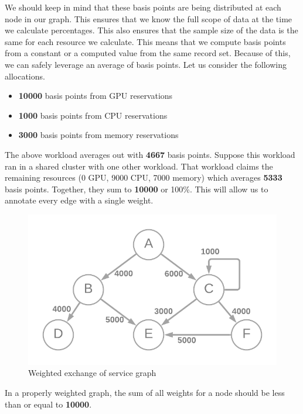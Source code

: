\documentclass[10pt, a4paper, twocolumn]{article}
\begin{document}
    We should keep in mind that these basis points are being distributed at each node in our graph.
    This ensures that we know the full scope of data at the time we calculate percentages.
    This also ensures that the sample size of the data is the same for each resource we calculate.
    This means that we compute basis points from a constant or a computed value from the same record set.
    Because of this, we can safely leverage an average of basis points.
    Let us consider the following allocations.

    \begin{itemize}
      \item \textbf{10000} basis points from GPU reservations
      \item \textbf{1000} basis points from CPU reservations
      \item \textbf{3000} basis points from memory reservations
    \end{itemize}

    The above workload averages out with \textbf{4667} basis points.
    Suppose this workload ran in a shared cluster with one other workload.
    That workload claims the remaining resources (0 GPU, 9000 CPU, 7000 memory) which averages \textbf{5333} basis points.
    Together, they sum to \textbf{10000} or 100\%.
    This will allow us to annotate every edge with a single weight.

    \begin{figure}[H]
      \centering
      \includegraphics[width=\linewidth]{./cost-attribution-graph-weighted.png}
      \caption{Weighted exchange of service graph}
      \label{figure:3}
    \end{figure}

    In a properly weighted graph, the sum of all weights for a node should be less than or equal to \textbf{10000}.
\end{document}
